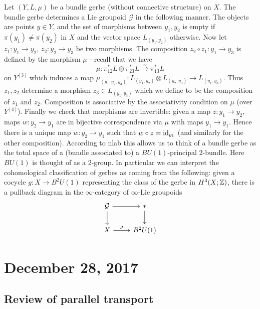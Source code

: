 \documentclass{amsart}
\begin{document}
Let $(Y,L,\mu)$ be a bundle gerbe (without connective structure) on $X$. The bundle
gerbe determines a Lie groupoid $\mathcal{G}$ in the following manner. The objects
are points $y\in Y$, and the set of morphisms between $y_1, y_2$ is empty if
$\pi(y_1)\neq \pi(y_2)$ in $X$ and the vector space $L_{(y_1,y_2)}$ otherwise.
Now let $z_1:y_1\to y_2$, $z_2:y_2\to y_3$ be two morphisms. The composition
$z_2\circ z_1:y_1\to y_3$ is defined by the morphism $\mu$---recall that
we have
\begin{equation*}
    \mu: \pi_{12}^*L \otimes \pi_{23}^*L \xrightarrow{\sim} \pi_{13}^*L
\end{equation*}
on $Y^{[3]}$ which induces a map $\mu_{(y_1,y_2,y_3)}:L_{(y_1,y_2)}\otimes L_{(y_2,y_3)}\to L_{(y_1,y_3)}$.
Thus $z_1,z_2$ determine a morphism $z_3\in L_{(y_1,y_3)}$ which we define to be
the composition of $z_1$ and $z_2$. Composition is associative by the associativity
condition on $\mu$ (over $Y^{[4]}$). Finally we check that morphisms are invertible:
given a map $z:y_1\to y_2$, maps $w:y_2\to y_1$ are in bijective correspondence
via $\mu$ with maps $y_1\to y_1$. Hence there is a unique map $w:y_2\to y_1$
such that $w\circ z = \operatorname{id}_{y_1}$ (and similarly for the other composition).
According to nlab this allows us to think of a bundle gerbe as the total space
of a (bundle associated to) a $BU(1)$-principal 2-bundle. Here $BU(1)$ is thought
of as a 2-group. In particular we can interpret the cohomological classification
of gerbes as coming from the following: given a cocycle $g:X\to B^2U(1)$ representing
the class of the gerbe in $H^3(X;\mathbb{Z})$, there is a pullback diagram in the $\infty$-category
of $\infty$-Lie groupoids
\begin{equation*}
    \begin{tikzcd}
        \mathcal{G} \rar\dar & *\dar \\
        X \rar{g} & B^2U(1)
    \end{tikzcd}
\end{equation*}


\section{December 28, 2017}

\subsection{Review of parallel transport}
\end{document}
